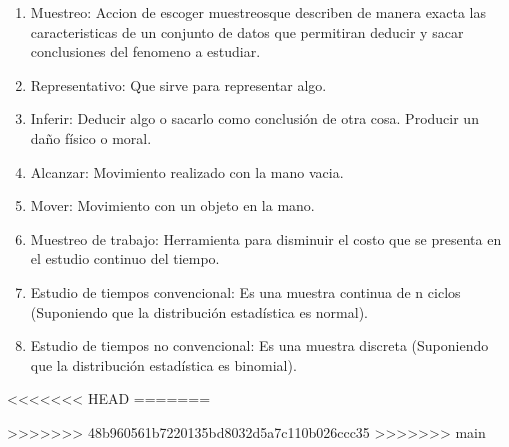 \begin{enumerate}
    \item Muestreo: Accion de escoger muestreosque describen de manera exacta las caracteristicas de un conjunto de datos que permitiran deducir y sacar conclusiones del fenomeno a estudiar.
    \cite{DiapositivasSema-4-04}
    \item Representativo: Que sirve para representar algo.
    \cite{DiapositivasSema-4-04}
    \item Inferir:  Deducir algo o sacarlo como conclusión de otra cosa. Producir un daño físico o moral.
    \cite{asalerae2023}
    \item Alcanzar: Movimiento realizado con la mano vacia.
    \cite{asale_rae_2023}
    \item Mover: Movimiento con un objeto en la mano.
    \cite{DiapositivasSema-2-22}
    \item Muestreo de trabajo: Herramienta para disminuir el costo que se presenta en el estudio continuo del tiempo.
    \cite{DiapositivasSema-4-04}
    \item Estudio de tiempos convencional: Es una muestra continua de n ciclos (Suponiendo que la distribución estadística es normal).
    \cite{DiapositivasSema-4-04}
    \item Estudio de tiempos no convencional: Es una muestra discreta (Suponiendo que la distribución estadística es binomial).
    \cite{DiapositivasSema-4-04}
\end{enumerate}


<<<<<<< HEAD
=======

>>>>>>> 48b960561b7220135bd8032d5a7c110b026ccc35
>>>>>>> main
